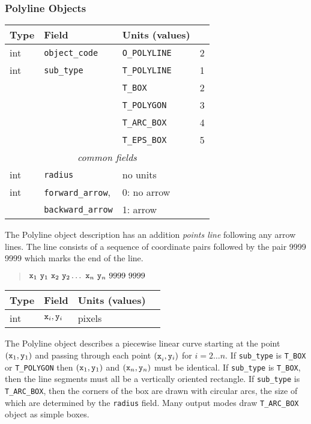 \subsubsection{Polyline Objects}
%
\begin{center}
\begin{tabular} {|l|l|ll|}
\hline
Type	& Field			& Units (values)	&	\\ \hline
\hline
%
int	& {\tt object\_code} 	& {\tt O\_POLYLINE}	& 2	 \\ \hline
%
int	& {\tt sub\_type}	& {\tt T\_POLYLINE}	& 1	\\
	&			& {\tt T\_BOX}		& 2	\\
	&			& {\tt T\_POLYGON}	& 3	\\
	&                       & {\tt T\_ARC\_BOX}   	& 4	\\
	&                       & {\tt T\_EPS\_BOX}   	& 5	\\ \hline
%
\multicolumn{4}{c}{\it common fields}				\\ \hline
%
int	& {\tt radius}		& no units		& 	\\
int	& {\tt forward\_arrow},	& 0: no arrow		&	\\
	& {\tt backward\_arrow}	& 1: arrow		&	\\ \hline
\end{tabular}
\end{center}
%
The Polyline object description has an addition {\em points line} following
	any arrow lines.
The line consists of a sequence of coordinate pairs followed by the
	pair 9999 9999 which marks the end of the line.
%
\begin{quote}
$
	 {\tt x}_1 ~{\tt y}_1 ~{\tt x}_2 ~{\tt y}_2 \ldots
	~{\tt x}_n ~{\tt y}_n ~9999 ~9999
$
\end{quote}
%
\begin{center}
\begin{tabular} {|l|l|ll|}
\hline
Type	& Field			& Units (values)	&	\\ \hline
\hline
%
int	& ${\tt x}_i, {\tt y}_i$& pixels		&	\\ \hline
\end{tabular}
\end{center}

The Polyline object describes a piecewise linear curve starting at
	the point $({\tt x}_1, {\tt y}_1)$ and passing through 
	each point ${(\tt x}_i, {\tt y}_i)$ for $i = 2 \ldots n$.
If {\tt sub\_type} is {\tt T\_BOX} or {\tt T\_POLYGON} then 
	$({\tt x}_1, {\tt y}_1)$ and $({\tt x}_n, {\tt y}_n)$ must
	be identical.
If {\tt sub\_type} is {\tt T\_BOX}, then the line segments must all be
	a vertically oriented rectangle.
If {\tt sub\_type} is {\tt T\_ARC\_BOX}, then the corners of the box are
	drawn with circular arcs, the size of which are determined by
	the {\tt radius} field.
Many output modes draw {\tt T\_ARC\_BOX} object as simple boxes.

